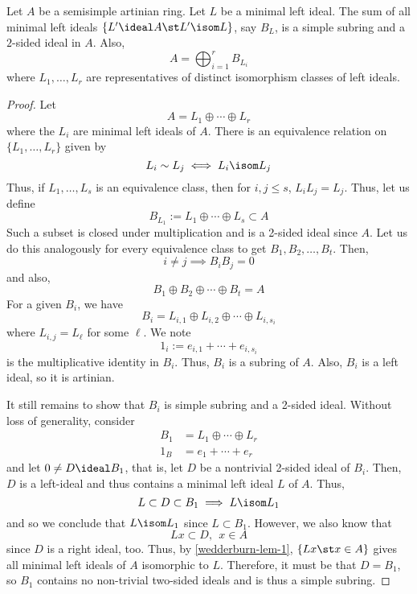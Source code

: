 \documentclass[11pt,leqno,oneside]{amsbook}
\numberwithin{thm}{section}
\begin{document}
\begin{thm}[Weddurburn]
  Let \(A\) be a semisimple artinian ring. Let \(L\) be a minimal left
  ideal. The sum of all minimal left ideals \(\{L' \ideal A
  \st L' \isom L\}\), say \(B_L\), is a simple subring and a
  \(2\)-sided ideal in \(A\). Also, \[
    A = \bigoplus_{i=1}^r B_{L_i}
  \]
  where \(L_1, \ldots, L_r\) are representatives of distinct
  isomorphism classes of left ideals.
\end{thm}
\begin{proof}
  Let \[
    A = L_1 \oplus \cdots \oplus L_r
  \]
  where the \(L_i\) are minimal left ideals of \(A\). There is an
  equivalence relation on \(\{L_1, \ldots, L_r\}\) given by \[
    L_i \sim L_j \iff L_i \isom L_j
  \]
  Thus, if \(L_1, \ldots, L_s\) is an equivalence class, then for
  \(i,j \leq s\), \(L_i L_j = L_j\). Thus, let us define \[
    B_{L_1} := L_{1} \oplus \cdots \oplus L_{s} \subset A 
  \]
  Such a subset is closed under multiplication and is a 2-sided ideal
  since \(A\). Let us do this 
  analogously for every equivalence class to get \(B_1, B_2, \ldots,
  B_t\). Then, \[
    i \neq j \implies B_i B_j = 0
  \]
  and also, \[
    B_1 \oplus B_2 \oplus \cdots \oplus B_t = A
  \]
  For a given \(B_i\), we have \[
    B_i = L_{i,1} \oplus L_{i,2} \oplus \cdots \oplus L_{i,s_i}
  \]
  where \(L_{i,j} = L_\ell\) for some \(\ell\). We note \[
    1_i := e_{i,1} + \cdots + e_{i,s_i}
  \]
  is the multiplicative identity in \(B_i\). Thus, \(B_i\) is a
  subring of \(A\). Also, \(B_i\) is a left ideal, so it is
  artinian.\\
  
  
  It still remains to show that \(B_i\) is simple subring and a
  2-sided ideal. Without loss of generality, consider
  \begin{align*}
    B_1 & = L_1 \oplus \cdots \oplus L_r \\
    1_B & = e_1 + \cdots + e_r
  \end{align*}
  and let \(0 \neq D \ideal B_1\), that is, let \(D\) be a nontrivial
  2-sided ideal of \(B_i\). Then, \(D\) is a left-ideal and thus
  contains a minimal left ideal \(L\) of \(A\). Thus, \[
    L \subset D \subset B_1 \implies L \isom L_1
  \]
  and so we conclude that \(L \isom L_1\) since \(L \subset
  B_1\). However, we also know that \[ 
    Lx \subset D, \ \ x \in A
  \]
  since \(D\) is a right ideal, too. Thus, by \ref{wedderburn-lem-1},
  \(\{Lx \st x \in A\}\) gives all minimal left ideals of \(A\) isomorphic to
  \(L\). Therefore, it must be that \(D = B_1\), so \(B_1\) contains
  no non-trivial two-sided ideals and is thus a simple subring.
\end{proof}
\end{document}
